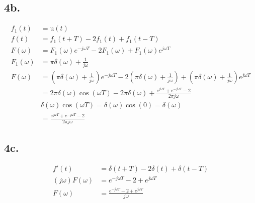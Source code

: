 \documentclass[letterpaper]{article}
\begin{document}
\subsection*{4b.}
\begin{align*}
    f_1(t) &=\mathrm{u}(t)\\
    f(t)&=f_1\left(t+T\right) - 2 f_1\left(t\right) + f_1\left(t - T\right)\\
    F(\omega) &= F_1(\omega) e^{-j\omega T} - 2 F_1(\omega) + F_1(\omega) e^{j\omega T}\\
    F_1(\omega) &= \pi \delta(\omega) + \frac{1}{j\omega}\\
    F(\omega) &= \left( \pi \delta(\omega) + \frac{1}{j\omega} \right) e^{-j\omega T} - 2\left( \pi \delta(\omega) + \frac{1}{j\omega} \right) + \left( \pi \delta(\omega) + \frac{1}{j\omega} \right) e^{j\omega T} \\
    &= 2\pi \delta(\omega) \cos(\omega T) - 2 \pi \delta(\omega) + \frac{e^{j\omega T} + e^{-j\omega T} - 2}{2\pi j \omega} \\
    &\delta(\omega)\cos(\omega T) = \delta(\omega)\cos(0) = \delta(\omega)\\
    &= \frac{e^{j\omega T} + e^{-j\omega T} - 2}{2\pi j \omega}
\end{align*}

\subsection*{4c.}
\begin{align*}
    f'(t) &=\delta(t+T) - 2\delta(t) + \delta(t-T)\\
    (j\omega)F(\omega) &= e^{-j\omega T} - 2 + e^{j\omega T}\\
    F(\omega) &= \frac{e^{-j\omega T} - 2 + e^{j\omega T}}{j\omega}
\end{align*}
\end{document}
